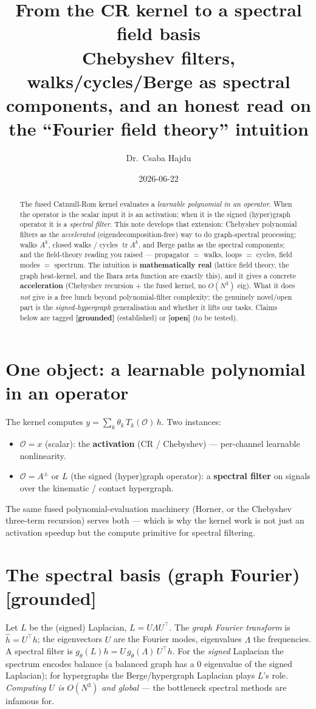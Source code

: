 \documentclass[11pt]{article}
\title{\textbf{From the CR kernel to a spectral field basis}\\[2pt]
  \large Chebyshev filters, walks/cycles/Berge as spectral components, and an honest read on the
  ``Fourier field theory'' intuition}
\author{Dr.\ Csaba Hajdu}
\date{2026-06-22}
\newcommand{\grd}{\textcolor{green!50!black}{\textbf{[grounded]}}}
\newcommand{\opn}{\textcolor{orange!80!black}{\textbf{[open]}}}
\begin{document}
\maketitle

\begin{abstract}\noindent
The fused Catmull-Rom kernel evaluates a \emph{learnable polynomial in an operator}. When the operator is the
scalar input it is an activation; when it is the signed (hyper)graph operator it is a \emph{spectral filter}.
This note develops that extension: Chebyshev polynomial filters as the \emph{accelerated} (eigendecomposition-free)
way to do graph-spectral processing; walks $A^k$, closed walks / cycles $\operatorname{tr}A^k$, and Berge paths
as the spectral components; and the field-theory reading you raised --- propagator $=$ walks, loops $=$ cycles,
field modes $=$ spectrum. The intuition is \textbf{mathematically real} (lattice field theory, the graph
heat-kernel, and the Ihara zeta function are exactly this), and it gives a concrete \textbf{acceleration}
(Chebyshev recursion + the fused kernel, no $O(N^3)$ eig). What it does \emph{not} give is a free lunch beyond
polynomial-filter complexity; the genuinely novel/open part is the \emph{signed-hypergraph} generalisation and
whether it lifts our tasks. Claims below are tagged \grd{} (established) or \opn{} (to be tested).
\end{abstract}

\section{One object: a learnable polynomial in an operator}
The kernel computes $y=\sum_k \theta_k\,T_k(\mathcal{O})\,h$. Two instances:
\begin{itemize}[nosep]
  \item $\mathcal{O}=x$ (scalar): the \textbf{activation} (CR / Chebyshev) --- per-channel learnable nonlinearity.
  \item $\mathcal{O}=A^{\pm}$ or $L$ (the signed (hyper)graph operator): a \textbf{spectral filter} on signals
        over the kinematic / contact hypergraph.
\end{itemize}
The same fused polynomial-evaluation machinery (Horner, or the Chebyshev three-term recursion) serves both ---
which is why the kernel work is not just an activation speedup but the compute primitive for spectral filtering.

\section{The spectral basis (graph Fourier) \grd}
Let $L$ be the (signed) Laplacian, $L=U\Lambda U^\top$. The \emph{graph Fourier transform} is $\hat h=U^\top h$;
the eigenvectors $U$ are the Fourier modes, eigenvalues $\Lambda$ the frequencies. A spectral filter is
$g_\theta(L)h=U\,g_\theta(\Lambda)\,U^\top h$. For the \emph{signed} Laplacian the spectrum encodes balance
(a balanced graph has a $0$ eigenvalue of the signed Laplacian); for hypergraphs the Berge/hypergraph Laplacian
plays $L$'s role. \emph{Computing $U$ is $O(N^3)$ and global} --- the bottleneck spectral methods are infamous for.
\end{document}
